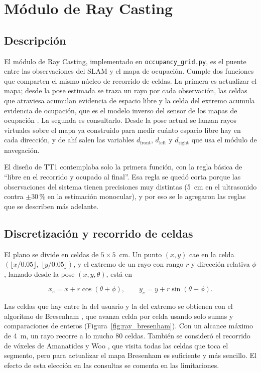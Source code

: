 \section{Módulo de Ray Casting}
\label{sec:dev_ray}

\subsection{Descripción}

El módulo de Ray Casting, implementado en \texttt{occupancy\_grid.py}, es el puente
entre las observaciones del SLAM y el mapa de ocupación. Cumple dos funciones que
comparten el mismo núcleo de recorrido de celdas. La primera es actualizar el mapa;
desde la pose estimada se traza un rayo por cada observación, las celdas que atraviesa
acumulan evidencia de espacio libre y la celda del extremo acumula evidencia de
ocupación, que es el modelo inverso del sensor de los mapas de ocupación
\cite{moravec1985sonar, elfes1989}. La segunda es consultarlo. Desde la pose actual se
lanzan rayos virtuales sobre el mapa ya construido para medir cuánto espacio libre hay
en cada dirección, y de ahí salen las variables $d_{\text{front}}$, $d_{\text{left}}$ y
$d_{\text{right}}$ que usa el módulo de navegación.

El diseño de TT1 contemplaba solo la primera función, con la regla básica de ``libre
en el recorrido y ocupado al final''. Esa regla se quedó corta porque las observaciones
del sistema tienen precisiones muy distintas (5~cm en el ultrasonido contra
$\pm 30$\,\% en la estimación monocular), y por eso se le agregaron las reglas que se
describen más adelante.

\subsection{Discretización y recorrido de celdas}

El plano se divide en celdas de $5 \times 5$~cm. Un punto $(x, y)$ cae en la celda
$(\lfloor x / 0.05 \rfloor,\; \lfloor y / 0.05 \rfloor)$, y el extremo de un rayo con
rango $r$ y dirección relativa $\phi$, lanzado desde la pose $(x, y, \theta)$, está en

\[
x_e = x + r\cos(\theta + \phi),
\qquad
y_e = y + r\sin(\theta + \phi).
\]

Las celdas que hay entre la del usuario y la del extremo se obtienen con el algoritmo de
Bresenham \cite{bresenham1965}, que avanza celda por celda usando solo sumas y
comparaciones de enteros (Figura~\ref{fig:ray_bresenham}). Con un alcance máximo de
4~m, un rayo recorre a lo mucho 80 celdas. También se consideró el recorrido de vóxeles
de Amanatides y Woo \cite{amanatides1987voxel}, que visita todas las celdas que toca el
segmento, pero para actualizar el mapa Bresenham es suficiente y más sencillo. El efecto
de esta elección en las consultas se comenta en las limitaciones.

